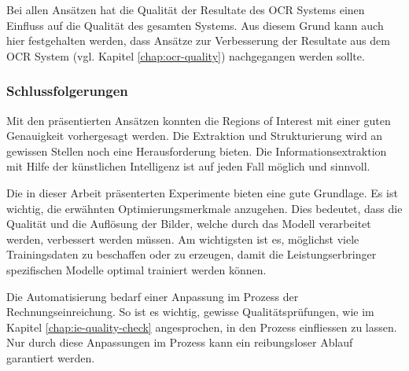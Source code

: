 
Bei allen Ansätzen hat die Qualität der Resultate des OCR Systems einen Einfluss auf die Qualität des gesamten Systems. Aus diesem Grund kann auch hier festgehalten werden, dass Ansätze zur Verbesserung der Resultate aus dem OCR System (vgl. Kapitel \ref{chap:ocr-quality}) nachgegangen werden sollte.




\subsubsection{Schlussfolgerungen}

Mit den präsentierten Ansätzen konnten die Regions of Interest mit einer guten Genauigkeit vorhergesagt werden. Die Extraktion und Strukturierung wird an gewissen Stellen noch eine Herausforderung bieten. Die Informationsextraktion mit Hilfe der künstlichen Intelligenz ist auf jeden Fall möglich und sinnvoll.

Die in dieser Arbeit präsenterten Experimente bieten eine gute Grundlage. Es ist wichtig, die erwähnten Optimierungsmerkmale anzugehen. Dies bedeutet, dass die Qualität und die Auflösung der Bilder, welche durch das Modell verarbeitet werden, verbessert werden müssen. Am wichtigsten ist es, möglichst viele Trainingsdaten zu beschaffen oder zu erzeugen, damit die Leistungserbringer spezifischen Modelle optimal trainiert werden können.

Die Automatisierung bedarf einer Anpassung im Prozess der Rechnungseinreichung. So ist es wichtig, gewisse Qualitätsprüfungen, wie im Kapitel \ref{chap:ie-quality-check} angesprochen, in den Prozess einfliessen zu lassen. Nur durch diese Anpassungen im Prozess kann ein reibungsloser Ablauf garantiert werden.
